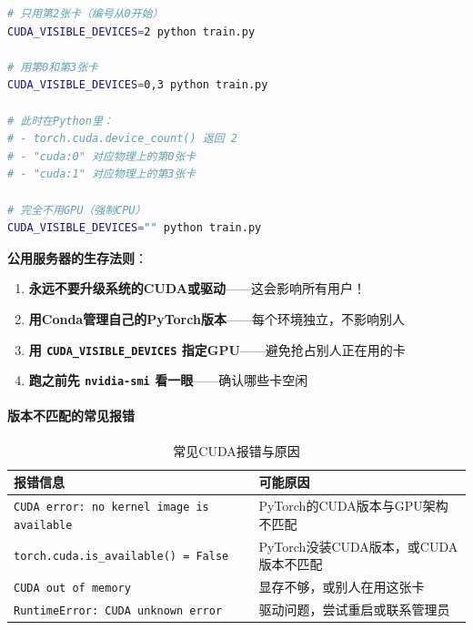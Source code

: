 \begin{lstlisting}[language=bash, caption=控制可见GPU]
# 只用第2张卡（编号从0开始）
CUDA_VISIBLE_DEVICES=2 python train.py

# 用第0和第3张卡
CUDA_VISIBLE_DEVICES=0,3 python train.py

# 此时在Python里：
# - torch.cuda.device_count() 返回 2
# - "cuda:0" 对应物理上的第0张卡
# - "cuda:1" 对应物理上的第3张卡

# 完全不用GPU（强制CPU）
CUDA_VISIBLE_DEVICES="" python train.py
\end{lstlisting}

\begin{warning}
\textbf{公用服务器的生存法则}：
\begin{enumerate}
    \item \textbf{永远不要升级系统的CUDA或驱动}——这会影响所有用户！
    \item \textbf{用Conda管理自己的PyTorch版本}——每个环境独立，不影响别人
    \item \textbf{用 \texttt{CUDA\_VISIBLE\_DEVICES} 指定GPU}——避免抢占别人正在用的卡
    \item \textbf{跑之前先 \texttt{nvidia-smi} 看一眼}——确认哪些卡空闲
\end{enumerate}
\end{warning}

\paragraph{版本不匹配的常见报错}\mbox{}\par\nopagebreak

\begin{table}[H]
\centering
\small
\renewcommand{\arraystretch}{1.4}
\begin{tabularx}{\textwidth}{X|X}
\toprule
\textbf{报错信息} & \textbf{可能原因} \\
\midrule
\texttt{CUDA error: no kernel image is available} & PyTorch的CUDA版本与GPU架构不匹配 \\
\texttt{torch.cuda.is\_available() = False} & PyTorch没装CUDA版本，或CUDA版本不匹配 \\
\texttt{CUDA out of memory} & 显存不够，或别人在用这张卡 \\
\texttt{RuntimeError: CUDA unknown error} & 驱动问题，尝试重启或联系管理员 \\
\bottomrule
\end{tabularx}
\caption{常见CUDA报错与原因}
\end{table}

